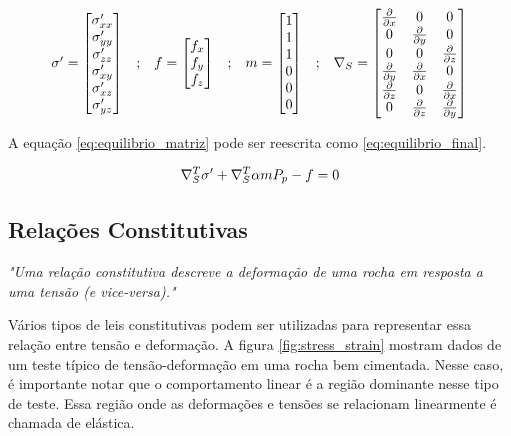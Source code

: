 \begin{equation}
\begin{matrix}
\sigma^\prime = \begin{bmatrix}
\sigma^\prime_{xx}
\\
\sigma^\prime_{yy}
\\
\sigma^\prime_{zz}
\\
\sigma^\prime_{xy}
\\
\sigma^\prime_{xz}
\\
\sigma^\prime_{yz}
\end{bmatrix}
&

;

&

f = \begin{bmatrix}
f_{x}
\\
f_{y}
\\
f_{z}
\end{bmatrix}
&
;
&

m = \begin{bmatrix} 1 \\ 1 \\ 1 \\ 0 \\ 0 \\ 0\end{bmatrix}

&
;

&
\nabla_S = \begin{bmatrix} \frac{\partial { }}{\partial x} & 0 & 0 \\ 0 & \frac{\partial { }}{\partial y} & 0 \\ 0 & 0 & \frac{\partial { }}{\partial z} \\ \frac{\partial { }}{\partial y} & \frac{\partial { }}{\partial x} & 0 \\ \frac{\partial { }}{\partial z} & 0 & \frac{\partial { }}{\partial x} \\ 0 & \frac{\partial { }}{\partial z} & \frac{\partial { }}{\partial y} \end{bmatrix}
\end{matrix}
\end{equation}

A equação \ref{eq:equilibrio_matriz} pode ser reescrita como \ref{eq:equilibrio_final}.

\begin{equation}
\label{eq:equilibrio_final}
\nabla_S^T\sigma^\prime + \nabla_S^T\alpha m  P_p - f = 0
\end{equation}


\subsection{Relações Constitutivas}

\textit{"Uma relação constitutiva descreve a deformação de uma rocha em resposta a uma tensão (e vice-versa)."} \cite{ResGeomec}


Vários tipos de leis constitutivas podem ser utilizadas para representar essa relação entre tensão e deformação. A figura \ref{fig:stress_strain} mostram dados de um teste típico de tensão-deformação em uma rocha bem cimentada. Nesse caso, é importante notar que o comportamento linear é a região dominante nesse tipo de teste. Essa região onde as deformações e tensões se relacionam linearmente é chamada de elástica.


